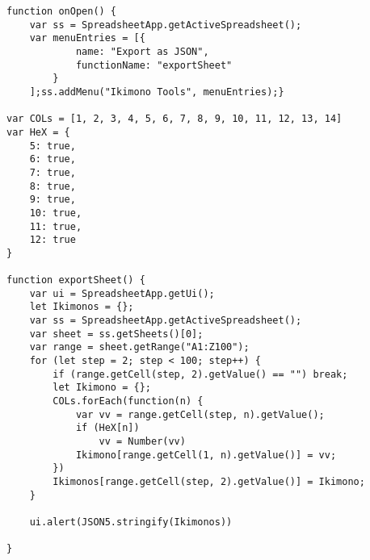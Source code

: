 \begin{verbatim}
function onOpen() {
    var ss = SpreadsheetApp.getActiveSpreadsheet();
    var menuEntries = [{
            name: "Export as JSON",
            functionName: "exportSheet"
        }
    ];ss.addMenu("Ikimono Tools", menuEntries);}

var COLs = [1, 2, 3, 4, 5, 6, 7, 8, 9, 10, 11, 12, 13, 14]
var HeX = {
    5: true,
    6: true,
    7: true,
    8: true,
    9: true,
    10: true,
    11: true,
    12: true
}

function exportSheet() {
    var ui = SpreadsheetApp.getUi();
    let Ikimonos = {};
    var ss = SpreadsheetApp.getActiveSpreadsheet();
    var sheet = ss.getSheets()[0];
    var range = sheet.getRange("A1:Z100");
    for (let step = 2; step < 100; step++) {
        if (range.getCell(step, 2).getValue() == "") break;
        let Ikimono = {};
        COLs.forEach(function(n) {
            var vv = range.getCell(step, n).getValue();
            if (HeX[n])
                vv = Number(vv)
            Ikimono[range.getCell(1, n).getValue()] = vv;
        })
        Ikimonos[range.getCell(step, 2).getValue()] = Ikimono;
    }

    ui.alert(JSON5.stringify(Ikimonos))

}
\end{verbatim}